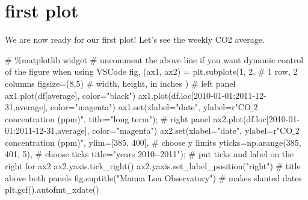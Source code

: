 \documentclass[
  letterpaper,
  DIV=11,
  numbers=noendperiod,
  oneside]{scrreprt}
\newenvironment{Shaded}{\begin{snugshade}}{\end{snugshade}}
\newcommand{\BuiltInTok}[1]{\textcolor[rgb]{0.00,0.23,0.31}{#1}}
\newcommand{\CommentTok}[1]{\textcolor[rgb]{0.37,0.37,0.37}{#1}}
\newcommand{\DecValTok}[1]{\textcolor[rgb]{0.68,0.00,0.00}{#1}}
\newcommand{\NormalTok}[1]{\textcolor[rgb]{0.00,0.23,0.31}{#1}}
\newcommand{\OperatorTok}[1]{\textcolor[rgb]{0.37,0.37,0.37}{#1}}
\newcommand{\StringTok}[1]{\textcolor[rgb]{0.13,0.47,0.30}{#1}}
\newcommand{\VerbatimStringTok}[1]{\textcolor[rgb]{0.13,0.47,0.30}{#1}}
\begin{document}
\hypertarget{first-plot}{%
\section{first plot}\label{first-plot}}

We are now ready for our first plot! Let's see the weekly CO2 average.

\begin{Shaded}
\begin{Highlighting}[]
\CommentTok{\# \%matplotlib widget}
\CommentTok{\# uncomment the above line if you want dynamic control of the figure when using VSCode}
\NormalTok{fig, (ax1, ax2) }\OperatorTok{=}\NormalTok{ plt.subplots(}\DecValTok{1}\NormalTok{, }\DecValTok{2}\NormalTok{,  }\CommentTok{\# 1 row, 2 columns}
\NormalTok{                               figsize}\OperatorTok{=}\NormalTok{(}\DecValTok{8}\NormalTok{,}\DecValTok{5}\NormalTok{)  }\CommentTok{\# width, height, in inches}
\NormalTok{                               )}
\CommentTok{\# left panel}
\NormalTok{ax1.plot(df[}\StringTok{\textquotesingle{}average\textquotesingle{}}\NormalTok{], color}\OperatorTok{=}\StringTok{"black"}\NormalTok{)}
\NormalTok{ax1.plot(df.loc[}\StringTok{\textquotesingle{}2010{-}01{-}01\textquotesingle{}}\NormalTok{:}\StringTok{\textquotesingle{}2011{-}12{-}31\textquotesingle{}}\NormalTok{,}\StringTok{\textquotesingle{}average\textquotesingle{}}\NormalTok{], color}\OperatorTok{=}\StringTok{"magenta"}\NormalTok{)}
\NormalTok{ax1.}\BuiltInTok{set}\NormalTok{(xlabel}\OperatorTok{=}\StringTok{"date"}\NormalTok{,}
\NormalTok{       ylabel}\OperatorTok{=}\VerbatimStringTok{r"CO$\_2$ concentration (ppm)"}\NormalTok{,}
\NormalTok{       title}\OperatorTok{=}\StringTok{"long term"}\NormalTok{)}\OperatorTok{;}
\CommentTok{\# right panel}
\NormalTok{ax2.plot(df.loc[}\StringTok{\textquotesingle{}2010{-}01{-}01\textquotesingle{}}\NormalTok{:}\StringTok{\textquotesingle{}2011{-}12{-}31\textquotesingle{}}\NormalTok{,}\StringTok{\textquotesingle{}average\textquotesingle{}}\NormalTok{], color}\OperatorTok{=}\StringTok{"magenta"}\NormalTok{)}
\NormalTok{ax2.}\BuiltInTok{set}\NormalTok{(xlabel}\OperatorTok{=}\StringTok{"date"}\NormalTok{,}
\NormalTok{        ylabel}\OperatorTok{=}\VerbatimStringTok{r"CO$\_2$ concentration (ppm)"}\NormalTok{,}
\NormalTok{        ylim}\OperatorTok{=}\NormalTok{[}\DecValTok{385}\NormalTok{, }\DecValTok{400}\NormalTok{],  }\CommentTok{\# choose y limits}
\NormalTok{        yticks}\OperatorTok{=}\NormalTok{np.arange(}\DecValTok{385}\NormalTok{, }\DecValTok{401}\NormalTok{, }\DecValTok{5}\NormalTok{),  }\CommentTok{\# choose ticks}
\NormalTok{        title}\OperatorTok{=}\StringTok{"years 2010{-}{-}2011"}\NormalTok{)}\OperatorTok{;}
\CommentTok{\# put ticks and label on the right for ax2}
\NormalTok{ax2.yaxis.tick\_right()}
\NormalTok{ax2.yaxis.set\_label\_position(}\StringTok{"right"}\NormalTok{)}
\CommentTok{\# title above both panels}
\NormalTok{fig.suptitle(}\StringTok{"Mauna Loa Observatory"}\NormalTok{)}
\CommentTok{\# makes slanted dates}
\NormalTok{plt.gcf().autofmt\_xdate()}
\end{Highlighting}
\end{Shaded}
\end{document}
